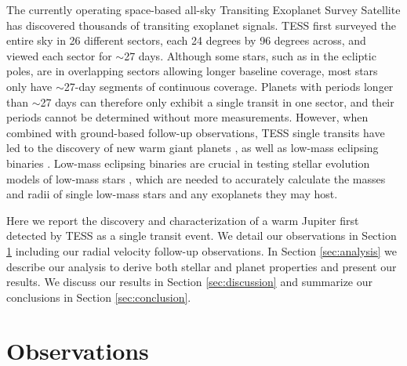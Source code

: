 \documentclass{aa}
\begin{document}
The currently operating space-based all-sky Transiting Exoplanet Survey Satellite \citep[TESS;][]{Ricker2015} has discovered thousands of transiting exoplanet signals. TESS first surveyed the entire sky in 26 different sectors, each 24 degrees by 96 degrees across, and viewed each sector for $\sim$27 days. Although some stars, such as in the ecliptic poles, are in overlapping sectors allowing longer baseline coverage, most stars only have $\sim$27-day segments of continuous coverage. Planets with periods longer than $\sim$27 days can therefore only exhibit a single transit in one sector, and their periods cannot be determined without more measurements. However, when combined with ground-based follow-up observations, TESS single transits have led to the discovery of new warm giant planets \citep[e.g.,][]{Gill2020c,Ulmer-Moll2022}, as well as low-mass eclipsing binaries \citep[e.g.,][]{Lendl2020,Gill2020a,Gill2020b,Gill2022}. Low-mass eclipsing binaries are crucial in testing stellar evolution models of low-mass stars \citep{Kraus2011,Feiden2015}, which are needed to accurately calculate the masses and radii of single low-mass stars and any exoplanets they may host.

Here we report the discovery and characterization of a warm Jupiter first detected by TESS as a single transit event. We detail our observations in Section \ref{sec:obs} including our radial velocity follow-up observations. In Section \ref{sec:analysis} we describe our analysis to derive both stellar and planet properties and present our results. We discuss our results in Section \ref{sec:discussion} and summarize our conclusions in Section \ref{sec:conclusion}.

\section{Observations} \label{sec:obs}
\end{document}
